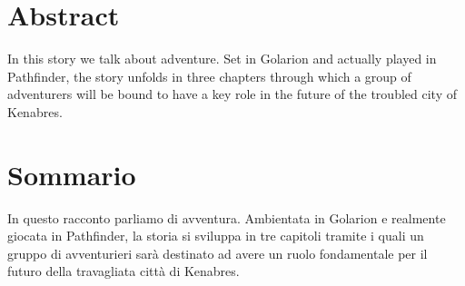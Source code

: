 
\begingroup
\let\clearpage\relax
\let\cleardoublepage\relax
\let\cleardoublepage\relax

\chapter*{Abstract}
In this story we talk about adventure. Set in Golarion and actually played in Pathfinder, the story unfolds in three chapters through which a group of adventurers will be bound to have a key role in the future of the troubled city of Kenabres.

\vfill

\chapter*{Sommario}
In questo racconto parliamo di avventura. Ambientata in Golarion e realmente giocata in Pathfinder, la storia si sviluppa in tre capitoli tramite i quali un gruppo di avventurieri sar\`a destinato ad avere un ruolo fondamentale per il futuro della travagliata citt\`a di Kenabres.

\endgroup			

\vfill

